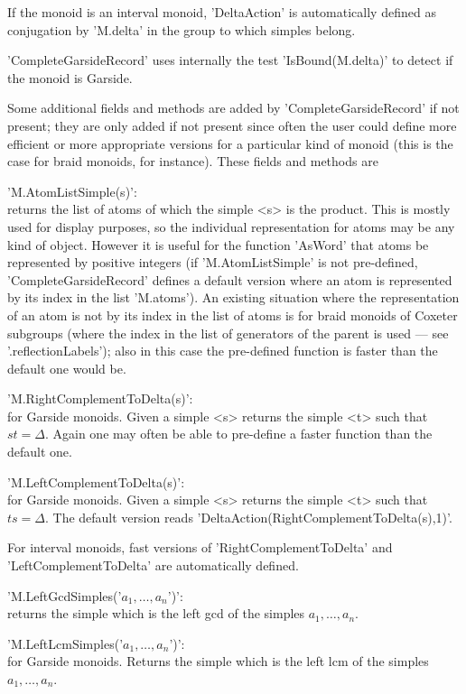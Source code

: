 If the monoid is an interval monoid, 'DeltaAction' is automatically defined
as conjugation by 'M.delta' in the group to which simples belong.

'CompleteGarsideRecord'  uses  internally  the  test  'IsBound(M.delta)' to
detect if the monoid is Garside.

Some  additional fields and methods are added by 'CompleteGarsideRecord' if
not  present; they are only added if not present since often the user could
define more efficient or more appropriate versions for a particular kind of
monoid (this is the case for braid monoids, for instance). These fields and
methods are \:

'M.AtomListSimple(s)':\\  returns the list of atoms of which the simple <s>
is the product. This is mostly used for display purposes, so the individual
representation  for atoms may be  any kind of object.  However it is useful
for  the function 'AsWord'  that atoms be  represented by positive integers
(if  'M.AtomListSimple' is not pre-defined, 'CompleteGarsideRecord' defines
a  default version where  an atom is  represented by its  index in the list
'M.atoms').  An existing situation  where the representation  of an atom is
not  by its  index in  the list  of atoms  is for  braid monoids of Coxeter
subgroups  (where the index in the list of generators of the parent is used
--- see '.reflectionLabels'); also in this case the pre-defined function is
faster than the default one would be.

'M.RightComplementToDelta(s)':\\  for Garside  monoids. Given  a simple <s>
returns  the simple <t> such that $st=\Delta$.  Again one may often be able
to pre-define a faster function than the default one.

'M.LeftComplementToDelta(s)':\\  for  Garside  monoids.  Given a simple <s>
returns  the simple  <t> such  that $ts=\Delta$.  The default version reads
'DeltaAction(RightComplementToDelta(s),1)'.

For   interval  monoids,  fast  versions  of  'RightComplementToDelta'  and
'LeftComplementToDelta' are automatically defined.

'M.LeftGcdSimples('$a_1,\ldots,a_n$')':\\  returns the simple  which is the
left gcd of the simples $a_1,\ldots,a_n$.

'M.LeftLcmSimples('$a_1,\ldots,a_n$')':\\  for Garside monoids. Returns the
simple which is the left lcm of the simples $a_1,\ldots,a_n$.

